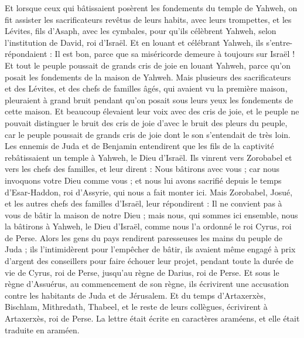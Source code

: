 \begin{multicols}{2}
Et lorsque ceux qui bâtissaient posèrent les fondements du temple de Yahweh, on fit assister les sacrificateurs revêtus de leurs habits, avec leurs trompettes, et les Lévites, fils d'Asaph, avec les cymbales, pour qu’ils célèbrent Yahweh, selon l’institution de David, roi d'Israël.
Et en louant et célébrant Yahweh, ils s'entre-répondaient : Il est bon, parce que sa miséricorde demeure à toujours sur Israël ! Et tout le peuple poussait de grands cris de joie en louant Yahweh, parce qu'on posait les fondements de la maison de Yahweh.
Mais plusieurs des sacrificateurs et des Lévites, et des chefs de familles âgés, qui avaient vu la première maison, pleuraient à grand bruit pendant qu'on posait sous leurs yeux les fondements de cette maison. Et beaucoup élevaient leur voix avec des cris de joie,
et le peuple ne pouvait distinguer le bruit des cris de joie  d'avec le bruit des pleurs du peuple, car le peuple poussait de grands cris de joie dont le son s’entendait de très loin.
\VerseOne{}Les ennemis de Juda et de Benjamin entendirent que les fils de la captivité rebâtissaient un temple à Yahweh, le Dieu d'Israël.
Ils vinrent vers Zorobabel et vers les chefs des familles, et leur dirent : Nous bâtirons avec vous ; car nous invoquons votre Dieu comme vous ; et nous lui avons sacrifié depuis le temps d'Esar-Haddon, roi d'Assyrie, qui nous a fait monter ici.
Mais Zorobabel, Josué, et les autres chefs des familles d'Israël, leur répondirent : Il ne convient pas à vous de bâtir la maison de notre Dieu ; mais nous, qui sommes ici ensemble, nous la bâtirons à Yahweh, le Dieu d'Israël, comme nous l'a ordonné le roi Cyrus, roi de Perse.
Alors les gens du pays rendirent paresseuses les mains du peuple de Juda ; ils l’intimidèrent pour l'empêcher de bâtir,
ils avaient même engagé à prix d’argent des conseillers pour faire échouer leur projet, pendant toute la durée de vie de Cyrus, roi de Perse, jusqu'au règne de Darius, roi de Perse.
Et sous le règne d'Assuérus, au commencement de son règne, ils écrivirent une accusation contre les habitants de Juda et de Jérusalem.
Et du temps d'Artaxerxès, Bischlam, Mithredath, Thabeel, et le reste de leurs collègues, écrivirent à Artaxerxès, roi de Perse. La lettre était écrite en caractères araméens, et elle était traduite en araméen.

\end{multicols}
